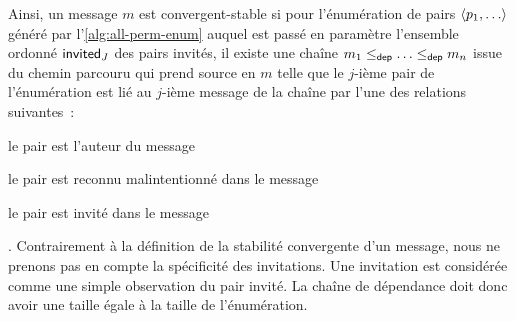 Ainsi, un message $m$ est convergent-stable si pour l'énumération de pairs $\tuple*{p_1, \dotsc}$ généré par l'\autoref{alg:all-perm-enum} auquel est passé en paramètre l'ensemble ordonné $\operatorname{\mathsf{invited}}_J$ des pairs invités, il existe une chaîne $m_1 \leq_{\operatorname{\mathsf{dep}}} \dotsc \leq_{\operatorname{\mathsf{dep}}} m_n$ issue du chemin parcouru qui prend source en $m$ telle que le $j$-ième pair de l'énumération est lié au $j$-ième message de la chaîne par l'une des relations suivantes~: \begin{inlinelist}
    \item le pair est l'auteur du message
    \item le pair est reconnu malintentionné dans le message
    \item le pair est invité dans le message
\end{inlinelist}.
Contrairement à la définition de la stabilité convergente d'un message, nous ne prenons pas en compte la spécificité des invitations.
Une invitation est considérée comme une simple observation du pair invité.
La chaîne de dépendance doit donc avoir une taille égale à la taille de l'énumération.

